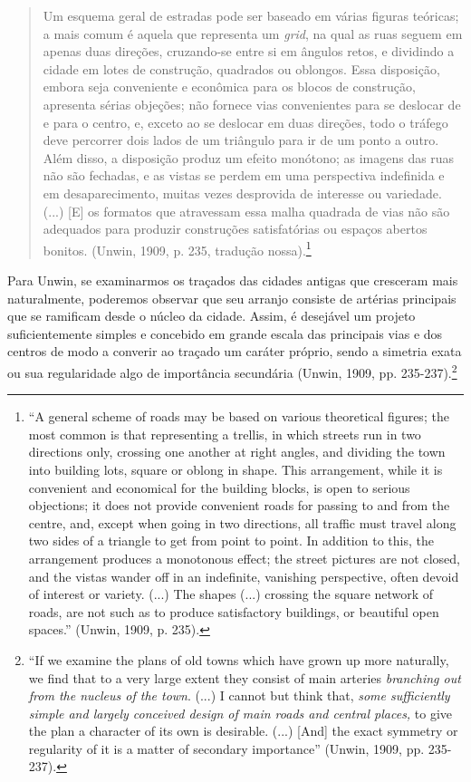 \documentclass[12pt, a4paper]{book} %
\begin{document}
        \begin{quotation}
            Um esquema geral de estradas pode ser baseado em várias figuras teóricas; a mais comum é aquela que representa um \textit{grid}, na qual as ruas seguem em apenas duas direções, cruzando-se entre si em ângulos retos, e dividindo a cidade em lotes de construção, quadrados ou oblongos. Essa disposição, embora seja conveniente e econômica para os blocos de construção, apresenta sérias objeções; não fornece vias convenientes para se deslocar de e para o centro, e, exceto ao se deslocar em duas direções, todo o tráfego deve percorrer dois lados de um triângulo para ir de um ponto a outro. Além disso, a disposição produz um efeito monótono; as imagens das ruas não são fechadas, e as vistas se perdem em uma perspectiva indefinida e em desaparecimento, muitas vezes desprovida de interesse ou variedade. (...) [E] os formatos que atravessam essa malha quadrada de vias não são adequados para produzir construções satisfatórias ou espaços abertos bonitos. (Unwin, 1909, p. 235, tradução nossa).\footnote[80]{``A general scheme of roads may be based on various theoretical figures; the most common is that representing a trellis, in which streets run in two directions only, crossing one another at right angles, and dividing the town into building lots, square or oblong in shape. This arrangement, while it is convenient and economical for the building blocks, is open to serious objections; it does not provide convenient roads for passing to and from the centre, and, except when going in two directions, all traffic must travel along two sides of a triangle to get from point to point. In addition to this, the arrangement produces a monotonous effect; the street pictures are not closed, and the vistas wander off in an indefinite, vanishing perspective, often devoid of interest or variety. (...) The shapes (...) crossing the square network of roads, are not such as to produce satisfactory buildings, or beautiful open spaces.'' (Unwin, 1909, p. 235).}
        \end{quotation}

        Para Unwin, se examinarmos os traçados das cidades antigas que cresceram mais naturalmente, poderemos observar que seu arranjo consiste de artérias principais que se ramificam desde o núcleo da cidade. Assim, é desejável um projeto suficientemente simples e concebido em grande escala das principais vias e dos centros de modo a converir ao traçado um caráter próprio, sendo a simetria exata ou sua regularidade algo de importância secundária (Unwin, 1909, pp. 235-237).\footnote[81]{``If we examine the plans of old towns which have grown up more naturally, we find that to a very large extent they consist of main arteries \textit{branching out from the nucleus of the town}. (...) I cannot but think that, \textit{some sufficiently simple and largely conceived design of main roads and central places,} to give the plan a character of its own is desirable. (...) [And] the exact symmetry or regularity of it is a matter of secondary importance'' (Unwin, 1909, pp. 235-237).}
\end{document}
